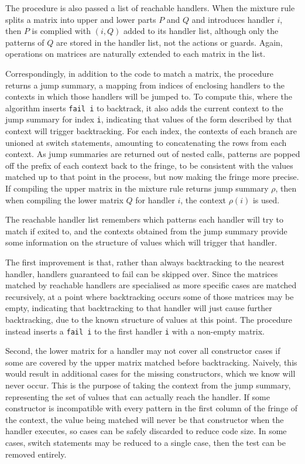 The procedure is also passed a list of reachable handlers. When the mixture rule splits a matrix into upper and lower parts $P$ and $Q$ and introduces handler $i$, then $P$ is complied with $(i, Q)$ added to its handler list, although only the patterns of $Q$ are stored in the handler list, not the actions or guards. Again, operations on matrices are naturally extended to each matrix in the list. 

Correspondingly, in addition to the code to match a matrix, the procedure returns a jump summary, a mapping from indices of enclosing handlers to the contexts in which those handlers will be jumped to. To compute this, where the algorithm inserts \verb|fail i| to backtrack, it also adds the current context to the jump summary for index \verb|i|, indicating that values of the form described by that context will trigger backtracking. For each index, the contexts of each branch are unioned at switch statements, amounting to concatenating the rows from each context. As jump summaries are returned out of nested calls, patterns are popped off the prefix of each context back to the fringe, to be consistent with the values matched up to that point in the process, but now making the fringe more precise. 
If compiling the upper matrix in the mixture rule returns jump summary $\rho$, then when compiling the lower matrix $Q$ for handler $i$, the context $\rho(i)$ is used.%


The reachable handler list remembers which patterns each handler will try to match if exited to, and the contexts obtained from the jump summary provide some information on the structure of values which will trigger that handler. 

The first improvement is that, rather than always backtracking to the nearest handler, handlers guaranteed to fail can be skipped over. Since the matrices matched by reachable handlers are specialised as more specific cases are matched recursively, at a point where backtracking occurs some of those matrices may be empty, indicating that backtracking to that handler will just cause further backtracking, due to the known structure of values at this point. The procedure instead inserts a \verb|fail i| to the first handler \verb|i| with a non-empty matrix. %

Second, the lower matrix for a handler may not cover all constructor cases if some are covered by the upper matrix matched before backtracking. Naively, this would result in additional cases for the missing constructors, which we know will never occur. This is the purpose of taking the context from the jump summary, representing the set of values that can actually reach the handler. If some constructor is incompatible with every pattern in the first column of the fringe of the context, the value being matched will never be that constructor when the handler executes, so cases can be safely discarded to reduce code size. In some cases, switch statements may be reduced to a single case, then the test can be removed entirely.



